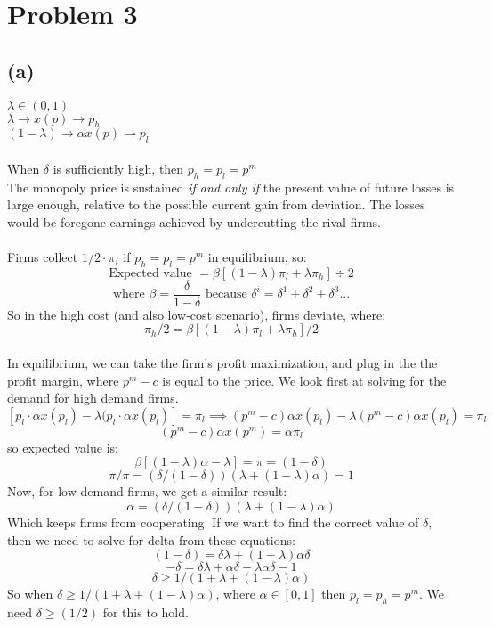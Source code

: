 \documentclass{article}
\begin{document}
\section{Problem 3}

\subsection*{(a)}

$\lambda \in (0,1)$ \\
$\lambda \rightarrow x(p) \rightarrow p_h$ \\
$(1-\lambda) \rightarrow \alpha x(p) \rightarrow p_l$ \\
\\
When $\delta$ is sufficiently high, then $p_h = p_l = p^m$ \\
The monopoly price is sustained \textit{if and only if} the present value of future losses is large enough, relative to the possible current gain from deviation. The losses would be foregone earnings achieved by undercutting the rival firms. \\
\\
Firms collect $1/2 \cdot \pi_i$ if $p_h = p_l = p^m$ in equilibrium, so:
\[
\text{Expected value }= \beta[(1-\lambda)\pi_l + \lambda \pi_h] \div 2
\]
\[
\text{where } \beta = \frac{\delta}{1-\delta} \text{ because } \delta^i = \delta^1 + \delta^2 + \delta^3...
\]
So in the high cost (and also low-cost scenario), firms deviate, where: 
\[
\pi_h/2 = \beta[(1-\lambda)\pi_l + \lambda \pi_h]/2
\]
\\
In equilibrium, we can take the firm's profit maximization, and plug in the the profit margin, where $p^m - c$ is equal to the price. We look first at solving for the demand for high demand firms.
\[
[p_l\cdot \alpha x(p_l) - \lambda(p_l\cdot \alpha x(p_l)] = \pi_l \implies (p^m - c)\alpha x(p_l) - \lambda(p^m -c)\alpha x(p_l) = \pi_l
\]
\[
(p^m -c)\alpha x(p^m) = \alpha \pi_l
\]
so expected value is: 
\[
\beta[(1-\lambda)\alpha - \lambda] = \pi = (1-\delta)
\]
\[
\pi/\pi = (\delta/(1-\delta))(\lambda + (1-\lambda)\alpha) = 1
\]
Now, for low demand firms, we get a similar result:
\[
\alpha = (\delta/(1-\delta))(\lambda + (1-\lambda)\alpha)
\]
Which keeps firms from cooperating. If we want to find the correct value of $\delta$, then we need to solve for delta from these equations: 
\[
(1-\delta) = \delta\lambda + (1-\lambda)\alpha\delta
\]
\[
-\delta = \delta\lambda +\alpha\delta - \lambda\alpha\delta - 1
\]
\[
\delta \geq 1/(1 + \lambda + (1-\lambda)\alpha)
\]
So when $\delta \geq 1/(1 + \lambda + (1-\lambda)\alpha)$, where $\alpha \in [0,1]$ then $p_l = p_h = p^m$. We need $\delta \geq (1/2)$ for this to hold. 
\end{document}
